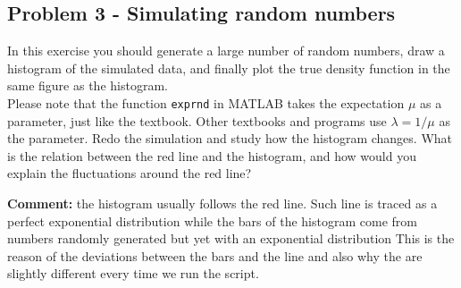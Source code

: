 \documentclass[letterpaper,12pt]{article}
\begin{document}
\subsection*{Problem 3 - Simulating random numbers}
In this exercise you should generate a large number of random numbers, draw a histogram of the simulated data, and finally plot the true density function in the same figure as the histogram.\\
Please note that the function \texttt{exprnd} in MATLAB takes the expectation $\mu$ as a parameter, just like the textbook. Other textbooks and programs use $\lambda = 1 / \mu$ as the parameter. Redo the simulation and study how the histogram changes. What is the relation between the red line and the histogram, and how would you explain the fluctuations around the red line?
\begin{tcolorbox}
\textbf{Comment:}
the histogram usually follows the red line. Such line is traced as a perfect exponential distribution while the bars of the histogram come from numbers randomly generated but yet with an exponential distribution This is the reason of the deviations between the bars and the line and also why the are slightly different every time we run the script.
\end{tcolorbox}
\end{document}
